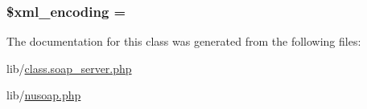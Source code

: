 \subsubsection[{\$xml\+\_\+encoding}]{\setlength{\rightskip}{0pt plus 5cm}\$xml\+\_\+encoding = \textquotesingle{}\textquotesingle{}}\label{classnusoap__server_a1e2ee3fea6dbb8374da999a9df7d024d}


The documentation for this class was generated from the following files\+:\begin{DoxyCompactItemize}
\item 
lib/\hyperlink{class_8soap__server_8php}{class.\+soap\+\_\+server.\+php}\item 
lib/\hyperlink{nusoap_8php}{nusoap.\+php}\end{DoxyCompactItemize}
